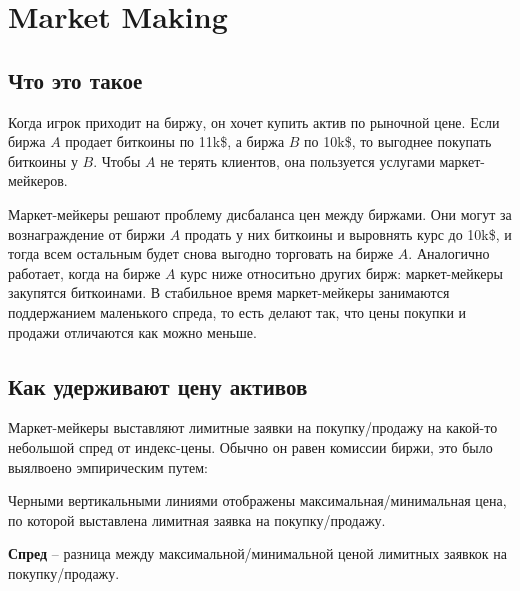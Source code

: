\section{Market Making}
\subsection{Что это такое}

Когда игрок приходит на биржу, он хочет купить актив по рыночной цене.
Если биржа $A$ продает биткоины по 11k\$, а биржа $B$ по 10k\$, то выгоднее покупать биткоины у $B$. Чтобы $A$ не терять клиентов, она пользуется услугами маркет-мейкеров.

Маркет-мейкеры решают проблему дисбаланса цен между биржами. Они могут за вознаграждение от биржи $A$ продать у них биткоины и выровнять курс до 10k\$, и тогда всем остальным будет снова выгодно торговать на бирже $A$. Аналогично работает, когда на бирже $A$ курс ниже относитьно других бирж: маркет-мейкеры закупятся биткоинами. В стабильное время маркет-мейкеры занимаются поддержанием маленького спреда, то есть делают так, что цены покупки и продажи отличаются как можно меньше.


\subsection{Как удерживают цену активов}

Маркет-мейкеры выставляют лимитные заявки на покупку/продажу на какой-то небольшой спред от индекс-цены. Обычно он равен комиссии биржи, это было выялвоено эмпирическим путем:

\begin{figure}[H]
\centering
{}
\end{figure}

Черными вертикальными линиями отображены максимальная/минимальная цена, по которой выставлена лимитная заявка на покупку/продажу.

 \textbf{Спред} -- разница между максимальной/минимальной ценой лимитных заявкок на покупку/продажу.

